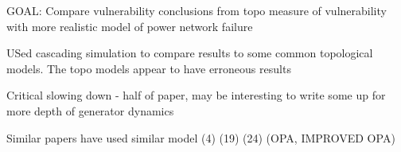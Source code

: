 GOAL: Compare vulnerability conclusions from topo measure of vulnerability with more realistic model of power network failure


USed cascading simulation to compare results to some common topological models.  The topo models appear to have erroneous results


Critical slowing down - half of paper, may be interesting to write some up for more depth of generator dynamics




  Similar papers have used similar model (4) (19) (24)  (OPA, IMPROVED OPA)

